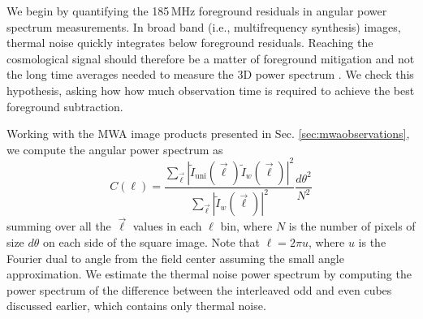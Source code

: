 \documentclass[numberedappendix]{emulateapj}
\begin{document}
We begin by quantifying the 185\,MHz foreground residuals in angular power spectrum measurements. In broad band (i.e., multifrequency synthesis) images, thermal noise quickly integrates below foreground residuals. Reaching the cosmological signal should therefore be a matter of foreground mitigation and not the long time averages needed to measure the 3D power spectrum \citep[e.g.][]{beardsley13,PoberNextGen}. We check this hypothesis, asking how how much observation time is required to achieve the best foreground subtraction.

Working with the MWA image products presented in Sec. \ref{sec:mwaobservations}, we compute the angular power spectrum as
\begin{equation}
	C(\ell)=\frac{\sum_{\vec{\ell}}|\tilde{I}_\text{uni}(\vec{\ell})\tilde{I}_w(\vec{\ell})|^2}{\sum_{\vec{\ell}}|\tilde{I}_w(\vec{\ell})|^2}\frac{d\theta^2}{N^2}
\end{equation}
summing over all the $\vec{\ell}$ values in each $\ell$ bin, where $N$ is the number of pixels of size $d\theta$ on each side of the square image. Note that $\ell=2\pi u$, where $u$ is the Fourier dual to angle from the field center assuming the small angle approximation. We estimate the thermal noise power spectrum by computing the power spectrum of the difference between the interleaved odd and even cubes discussed earlier, which contains only thermal noise.
\end{document}
